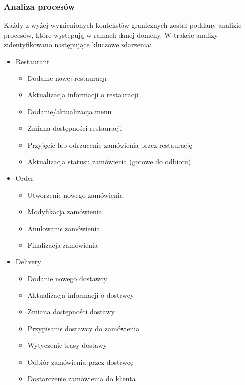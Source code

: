 \subsubsection{Analiza procesów}


Każdy z wyżej wymienionych kontekstów granicznych został poddany analizie procesów, które występują w ramach danej domeny. W trakcie analizy zidentyfikowano następujące kluczowe zdarzenia:

\begin{itemize}
    \item Restaurant
    \begin{itemize}
        \item Dodanie nowej restauracji
        \item Aktualizacja informacji o restauracji
        \item Dodanie/aktualizacja menu
        \item Zmiana dostępności restauracji
        \item Przyjęcie lub odrzucenie zamówienia przez restaurację
        \item Aktualizacja statusu zamówienia (gotowe do odbioru)
    \end{itemize}
    
    \item Order
    \begin{itemize}
        \item Utworzenie nowego zamówienia
        \item Modyfikacja zamówienia
        \item Anulowanie zamówienia
        \item Finalizacja zamówienia
    \end{itemize}
    
    \item Delivery
    \begin{itemize}
        \item Dodanie nowego dostawcy
        \item Aktualizacja informacji o dostawcy
        \item Zmiana dostępności dostawy
        \item Przypisanie dostawcy do zamówienia
        \item Wytyczenie trasy dostawy
        \item Odbiór zamówienia przez dostawcę
        \item Dostarczenie zamówienia do klienta
    \end{itemize}
    

\end{itemize}
